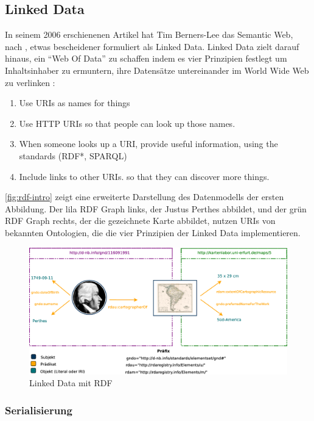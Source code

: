 \documentclass[../main.tex]{subfiles}
\begin{document}
\subsection{Linked Data}
\label{sec:linked-data}

In seinem 2006 erschienenen Artikel hat Tim Berners-Lee das Semantic Web, nach \citeauthor{dewilde2015information}, etwas bescheidener formuliert als Linked Data. Linked Data zielt darauf hinaus, ein \hyphenquote{german}{Web Of Data} zu schaffen indem es vier Prinzipien festlegt um Inhaltsinhaber zu ermuntern, ihre Datensätze untereinander im World Wide Web zu verlinken \autocite{berners2006linked}: 

\begin{enumerate}
	\item Use URIs as names for things
	\item Use HTTP URIs so that people can look up those names.
	\item When someone looks up a URI, provide useful information, using the standards (RDF*, SPARQL)
	\item Include links to other URIs. so that they can discover more things.
\end{enumerate}

\autoref{fig:rdf-intro} zeigt eine erweiterte Darstellung des Datenmodells der ersten Abbildung. Der lila RDF Graph links, der Justus Perthes abbildet, und der grün RDF Graph rechts, der die gezeichnete Karte abbildet, nutzen URIs von bekannten Ontologien, die die vier Prinzipien der Linked Data implementieren.

\begin{figure}[h]
	\centering
	\includegraphics[width=1\linewidth]{images/rdf-intro}
	\caption[Linked Data mit RDF]{Linked Data mit RDF}
	\label{fig:rdf-intro}
\end{figure}

\subsubsection{Serialisierung}
\label{sec:serialisierung}
\end{document}

